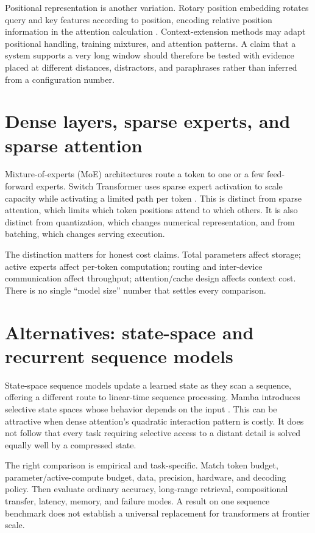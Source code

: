 \documentclass[11pt]{article}
\begin{document}
Positional representation is another variation. Rotary position embedding rotates query and key features according to position, encoding relative position information in the attention calculation \cite{su2021roformer}. Context-extension methods may adapt positional handling, training mixtures, and attention patterns. A claim that a system supports a very long window should therefore be tested with evidence placed at different distances, distractors, and paraphrases rather than inferred from a configuration number.

\section{Dense layers, sparse experts, and sparse attention}
Mixture-of-experts (MoE) architectures route a token to one or a few feed-forward experts. Switch Transformer uses sparse expert activation to scale capacity while activating a limited path per token \cite{fedus2022switch}. This is distinct from sparse attention, which limits which token positions attend to which others. It is also distinct from quantization, which changes numerical representation, and from batching, which changes serving execution.

The distinction matters for honest cost claims. Total parameters affect storage; active experts affect per-token computation; routing and inter-device communication affect throughput; attention/cache design affects context cost. There is no single ``model size'' number that settles every comparison.

\section{Alternatives: state-space and recurrent sequence models}
State-space sequence models update a learned state as they scan a sequence, offering a different route to linear-time sequence processing. Mamba introduces selective state spaces whose behavior depends on the input \cite{gu2023mamba}. This can be attractive when dense attention's quadratic interaction pattern is costly. It does not follow that every task requiring selective access to a distant detail is solved equally well by a compressed state.

The right comparison is empirical and task-specific. Match token budget, parameter/active-compute budget, data, precision, hardware, and decoding policy. Then evaluate ordinary accuracy, long-range retrieval, compositional transfer, latency, memory, and failure modes. A result on one sequence benchmark does not establish a universal replacement for transformers at frontier scale.
\end{document}
